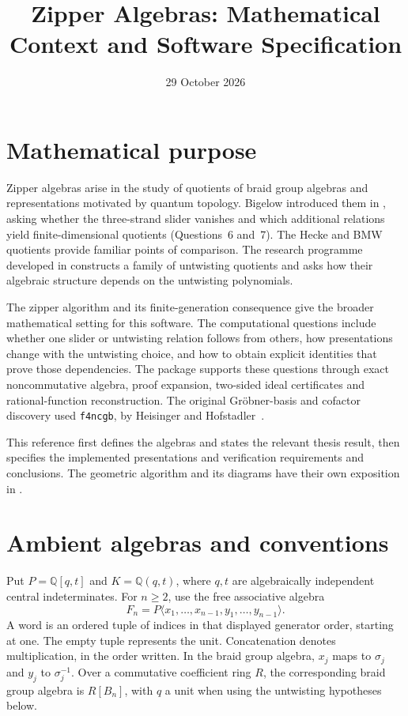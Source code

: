 \documentclass[11pt]{article}
\title{Zipper Algebras: Mathematical Context and Software Specification}
\author{}
\date{29 October 2026}
\newcommand{\Q}{\mathbb Q}
\begin{document}
\maketitle

\section{Mathematical purpose}
Zipper algebras arise in the study of quotients of braid group algebras and
representations motivated by quantum topology. Bigelow introduced them in
\cite[\S8, pp.~297--298]{bigelow}, asking whether the three-strand slider
vanishes and which additional relations yield finite-dimensional quotients
(Questions~6 and~7). The Hecke and BMW quotients provide familiar points of
comparison. The research programme developed in \cite{thesis} constructs a
family of untwisting quotients and asks how their algebraic structure depends
on the untwisting polynomials.

The zipper algorithm and its finite-generation consequence give the broader
mathematical setting for this software. The computational questions include
whether one slider or untwisting relation follows from others, how presentations
change with the untwisting choice, and how to obtain explicit identities that
prove those dependencies. The package supports these questions through exact
noncommutative algebra, proof expansion, two-sided ideal certificates and
rational-function reconstruction. The original Gr\"obner-basis and cofactor
discovery used \texttt{f4ncgb}, by Heisinger and Hofstadler~\cite{f4ncgb}.

This reference first defines the algebras and states the relevant thesis result,
then specifies the implemented presentations and verification requirements and conclusions.
The geometric algorithm and its diagrams have their own exposition in
\cite[\S3.4]{thesis}.

\section{Ambient algebras and conventions}
Put $P=\Q[q,t]$ and $K=\Q(q,t)$, where $q,t$ are algebraically independent central
indeterminates. For $n\ge2$, use the free associative algebra
\[
 F_n=P\langle x_1,\ldots,x_{n-1},y_1,\ldots,y_{n-1}\rangle.
\]
A word is an ordered tuple of indices in that displayed generator order,
starting at one. The empty tuple represents the unit. Concatenation denotes
multiplication, in the order written. In the braid group algebra, $x_j$ maps to
$\sigma_j$ and $y_j$ to $\sigma_j^{-1}$. Over a commutative coefficient ring
$R$, the corresponding braid group algebra is $R[B_n]$, with $q$ a unit when
using the untwisting hypotheses below.
\end{document}

